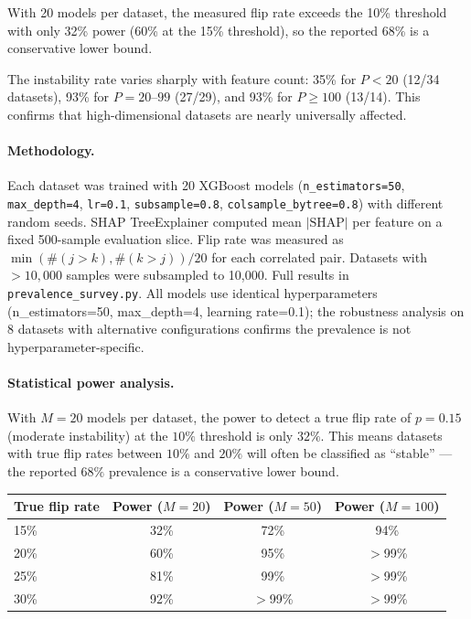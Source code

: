 \documentclass{article}
\begin{document}
With 20 models per dataset, the measured flip rate exceeds the 10\% threshold with only 32\% power (60\% at the 15\% threshold), so the reported 68\% is a conservative lower bound.

The instability rate varies sharply with feature count: 35\% for $P < 20$ (12/34 datasets), 93\% for $P = 20$--$99$ (27/29), and 93\% for $P \geq 100$ (13/14). This confirms that high-dimensional datasets are nearly universally affected.

\paragraph{Methodology.}
\begin{sloppypar}
Each dataset was trained with 20 XGBoost models (\texttt{n\_estimators=50},
\texttt{max\_depth=4}, \texttt{lr=0.1}, \texttt{subsample=0.8},
\texttt{colsample\_bytree=0.8}) with different random seeds. SHAP TreeExplainer
computed mean $|\text{SHAP}|$ per feature on a fixed 500-sample evaluation slice.
Flip rate was measured as $\min(\#(j{>}k), \#(k{>}j)) / 20$ for each correlated
pair. Datasets with $> 10{,}000$ samples were subsampled to 10{,}000. Full results
in \texttt{prevalence\_survey.py}.
All models use identical hyperparameters (n\_estimators=50, max\_depth=4, learning rate=0.1); the robustness analysis on 8 datasets with alternative configurations confirms the prevalence is not hyperparameter-specific.
\end{sloppypar}

\paragraph{Statistical power analysis.}
With $M = 20$ models per dataset, the power to detect a true flip rate of $p = 0.15$ (moderate instability) at the $10\%$ threshold is only $32\%$. This means datasets with true flip rates between $10\%$ and $20\%$ will often be classified as ``stable'' --- the reported $68\%$ prevalence is a conservative lower bound.

\begin{center}
\small
\begin{tabular}{@{}lccc@{}}
\toprule
True flip rate & Power ($M{=}20$) & Power ($M{=}50$) & Power ($M{=}100$) \\
\midrule
15\% & 32\% & 72\% & 94\% \\
20\% & 60\% & 95\% & $>$99\% \\
25\% & 81\% & 99\% & $>$99\% \\
30\% & 92\% & $>$99\% & $>$99\% \\
\bottomrule
\end{tabular}
\end{center}
\end{document}
